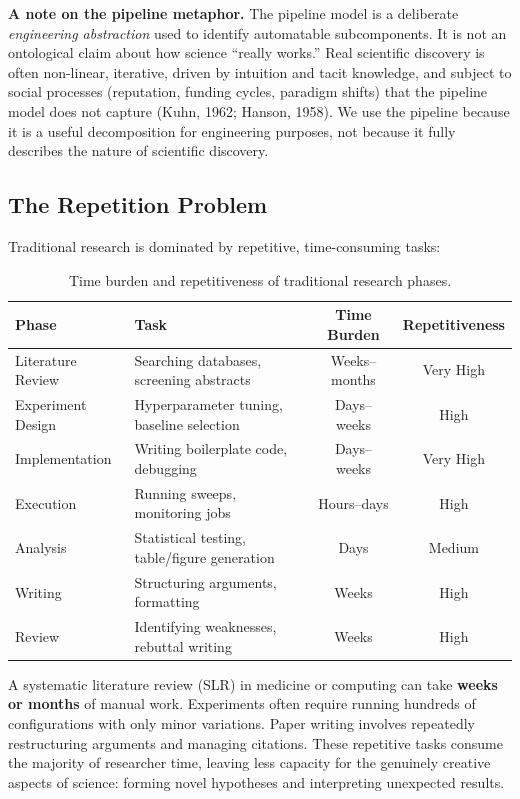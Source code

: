 \documentclass[11pt,a4paper]{article}
\begin{document}
\textbf{A note on the pipeline metaphor.} The pipeline model is a deliberate \textit{engineering abstraction} used to identify automatable subcomponents. It is not an ontological claim about how science ``really works.'' Real scientific discovery is often non-linear, iterative, driven by intuition and tacit knowledge, and subject to social processes (reputation, funding cycles, paradigm shifts) that the pipeline model does not capture (Kuhn, 1962; Hanson, 1958). We use the pipeline because it is a useful decomposition for engineering purposes, not because it fully describes the nature of scientific discovery.

\subsection{The Repetition Problem}

Traditional research is dominated by repetitive, time-consuming tasks:

\begin{table}[h]
\centering
\small
\begin{tabular}{@{}llcc@{}}
\toprule
\textbf{Phase} & \textbf{Task} & \textbf{Time Burden} & \textbf{Repetitiveness} \\
\midrule
Literature Review & Searching databases, screening abstracts & Weeks--months & Very High \\
Experiment Design & Hyperparameter tuning, baseline selection & Days--weeks & High \\
Implementation & Writing boilerplate code, debugging & Days--weeks & Very High \\
Execution & Running sweeps, monitoring jobs & Hours--days & High \\
Analysis & Statistical testing, table/figure generation & Days & Medium \\
Writing & Structuring arguments, formatting & Weeks & High \\
Review & Identifying weaknesses, rebuttal writing & Weeks & High \\
\bottomrule
\end{tabular}
\caption{Time burden and repetitiveness of traditional research phases.}
\label{tab:repetition}
\end{table}

A systematic literature review (SLR) in medicine or computing can take \textbf{weeks or months} of manual work. Experiments often require running hundreds of configurations with only minor variations. Paper writing involves repeatedly restructuring arguments and managing citations. These repetitive tasks consume the majority of researcher time, leaving less capacity for the genuinely creative aspects of science: forming novel hypotheses and interpreting unexpected results.
\end{document}
